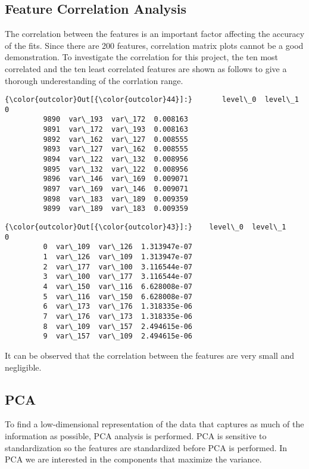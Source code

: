 \documentclass[11pt]{article}
\begin{document}
    \hypertarget{feature-correlation-analysis}{%
\subsection{Feature Correlation
Analysis}\label{feature-correlation-analysis}}
The correlation between the features is an important factor affecting the accuracy of the fits. Since there are 200 features, correlation matrix plots cannot be a good demonstration. To investigate the correlation for this project, the ten most correlated and the ten least correlated features are shown as follows to give a thorough underestanding of the corrlation range. 
\begin{Verbatim}[commandchars=\\\{\}]
{\color{outcolor}Out[{\color{outcolor}44}]:}       level\_0  level\_1         0
         9890  var\_193  var\_172  0.008163
         9891  var\_172  var\_193  0.008163
         9892  var\_162  var\_127  0.008555
         9893  var\_127  var\_162  0.008555
         9894  var\_122  var\_132  0.008956
         9895  var\_132  var\_122  0.008956
         9896  var\_146  var\_169  0.009071
         9897  var\_169  var\_146  0.009071
         9898  var\_183  var\_189  0.009359
         9899  var\_189  var\_183  0.009359
\end{Verbatim}
            
\begin{Verbatim}[commandchars=\\\{\}]
{\color{outcolor}Out[{\color{outcolor}43}]:}    level\_0  level\_1             0
         0  var\_109  var\_126  1.313947e-07
         1  var\_126  var\_109  1.313947e-07
         2  var\_177  var\_100  3.116544e-07
         3  var\_100  var\_177  3.116544e-07
         4  var\_150  var\_116  6.628008e-07
         5  var\_116  var\_150  6.628008e-07
         6  var\_173  var\_176  1.318335e-06
         7  var\_176  var\_173  1.318335e-06
         8  var\_109  var\_157  2.494615e-06
         9  var\_157  var\_109  2.494615e-06
\end{Verbatim}
            
    It can be observed that the correlation between the features are very
small and negligible.

    \hypertarget{pca}{%
\subsection{PCA}\label{pca}}

    To find a low-dimensional representation of the data that captures as
much of the information as possible, PCA analysis is performed. PCA is
sensitive to standardization so the features are standardized before PCA
is performed. In PCA we are interested in the components that maximize
the variance.
\end{document}
